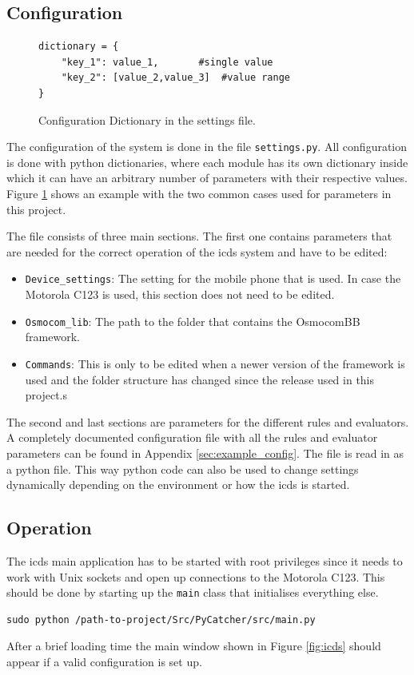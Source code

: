 \subsection{Configuration}
\label{sec:configuration}
\begin{figure}
\begin{lstlisting}
dictionary = {
	"key_1": value_1,		#single value
	"key_2": [value_2,value_3]	#value range
}
\end{lstlisting}
\caption{Configuration Dictionary in the settings file.}
\label{fig:python_dict}
\end{figure}
The configuration of the system is done in the file \texttt{settings.py}.
All configuration is done with python dictionaries, where each module has its own dictionary inside which it can have an arbitrary number of parameters with their respective values.
Figure \ref{fig:python_dict} shows an example with the two common cases used for parameters in this project.

The file consists of three main sections.
The first one contains parameters that are needed for the correct operation of the \gls{icds} system and have to be edited:
\begin{itemize}
	\item \texttt{Device\_settings}: The setting for the mobile phone that is used.
	In case the Motorola C123 is used, this section does not need to be edited.
	\item \texttt{Osmocom\_lib}: The path to the folder that contains the OsmocomBB framework.
	\item \texttt{Commands}: This is only to be edited when a newer version of the framework is used and the folder structure has changed since the release used in this project.s
\end{itemize}
The second and last sections are parameters for the different rules and evaluators.
A completely documented configuration file with all the rules and evaluator parameters can be found in Appendix \ref{sec:example_config}.
The file is read in as a python file.
This way python code can also be used to change settings dynamically depending on the environment or how the \gls{icds} is started.

\subsection{Operation}
\label{sec:icds_operation}
The \gls{icds} main application has to be started with root privileges since it needs to work with Unix sockets and open up connections to the Motorola C123.
This should be done by starting up the \texttt{main} class that initialises everything else.
\begin{lstlisting}
sudo python /path-to-project/Src/PyCatcher/src/main.py
\end{lstlisting}
After a brief loading time the main window shown in Figure \ref{fig:icds} should appear if a valid configuration is set up.

